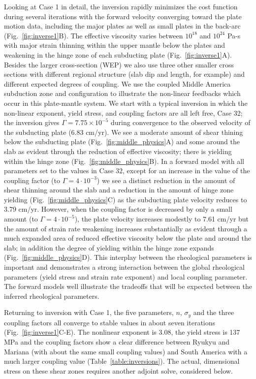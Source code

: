 \documentclass[12pt]{article}
\begin{document}
{Looking at Case 1 in detail, the inversion rapidly minimizes the 
cost function during several iterations with the forward velocity converging toward the plate motion data,
including the major plates as well as small plates in the back-arc (Fig.~\ref{fig:inverse1}B).
The effective viscosity varies between $10^{18}$ and $10^{24}$ Pa-s with major strain thinning within the upper mantle below the plates and weakening in the hinge zone of each subducting plate (Fig.~\ref{fig:inverse1}A).
Besides the larger cross-section (WEP) we also use three other smaller cross sections with different regional structure (slab dip and length, for example) and different expected degrees of coupling. 
We use the coupled Middle America subduction zone and configuration to illustrate the non-linear feedbacks which occur in this plate-mantle system.
We start with a typical inversion in which the non-linear exponent, yield stress, and coupling factors are all left free, Case 32; the inversion gives $\Gamma=7.75\times10^{-5}$ during convergence to the observed velocity of the subducting plate (6.83 cm/yr). 
We see a moderate amount of shear thining below the subducting plate (Fig.~\ref{fig:middle_physics}A) and some around the slab as evident through the reduction of effective viscosity; there is yielding within the hinge zone (Fig.~\ref{fig:middle_physics}B).
In a forward model with all parameters set to the values in Case 32, except for an increase in the value of the coupling factor
(to $\Gamma=4\cdot 10^{-3}$) we see a distinct reduction in the amount of shear thinning around the slab and a reduction in the amount of hinge zone yielding (Fig.~\ref{fig:middle_physics}C) as the subducting plate velocity 
reduces to 3.79 cm/yr.
However, when the coupling factor is decreased by only a small amount (to $\Gamma=4\cdot 10^{-5}$), the plate velocity increases modestly to 7.61 cm/yr  but the amount of strain rate weakening increases substantially as evident through a much expanded area of reduced effective viscosity below the plate and around the slab; in addition the degree of yielding within the hinge zone expands (Fig.~\ref{fig:middle_physics}D). This interplay between the rheological parameters is important and demonstrates a strong interaction between the global rheological parameters (yield stress and strain rate exponent) and local coupling parameter.
The forward models well illustrate the tradeoffs that will be expected between the inferred rheological parameters.


 Returning to inversion with Case 1, the five parameters, $n$, $\sigma_y$ and the three coupling factors all converge to stable values in about seven iterations (Fig.~\ref{fig:inverse1}C-E).
The nonlinear exponent is 3.08, the yield stress is 137 MPa and the coupling factors show a clear difference between  Ryukyu and Mariana (with about the same small coupling values) and South America with a much larger coupling value (Table~\ref{table:inversions}). The actual, dimensional stress on these shear zones requires another adjoint solve, considered below.
 

}
\end{document}
